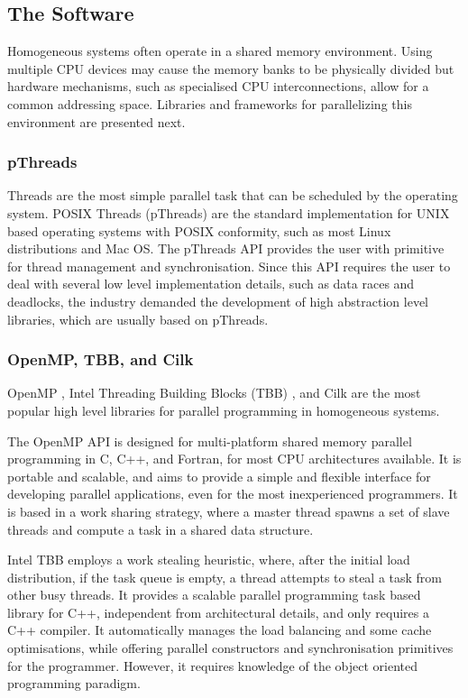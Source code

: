 \subsection{The Software}
\label{shared_mem}

Homogeneous systems often operate in a shared memory environment. Using multiple CPU devices may cause the memory banks to be physically divided but hardware mechanisms, such as specialised CPU interconnections, allow for a common addressing space. Libraries and frameworks for parallelizing this environment are presented next.

\subsubsection*{pThreads}

Threads are the most simple parallel task that can be scheduled by the operating system. POSIX Threads (pThreads) are the standard implementation for UNIX based operating systems with POSIX conformity, such as most Linux distributions and Mac OS. The pThreads API provides the user with primitive for thread management and synchronisation. Since this API requires the user to deal with several low level implementation details, such as data races and deadlocks, the industry demanded the development of high abstraction level libraries, which are usually based on pThreads.

\subsubsection*{OpenMP, TBB, and Cilk}

OpenMP \cite{OpenMP}, Intel Threading Building Blocks (TBB) \cite{Intel:TBB}, and Cilk \cite{Intel:Cilk} are the most popular high level libraries for parallel programming in homogeneous systems.

The OpenMP API is designed for multi-platform shared memory parallel programming in C, C++, and Fortran, for most CPU architectures available. It is portable and scalable, and aims to provide a simple and flexible interface for developing parallel applications, even for the most inexperienced programmers. It is based in a work sharing strategy, where a master thread spawns a set of slave threads and compute a task in a shared data structure.

Intel TBB employs a work stealing heuristic, where, after the initial load distribution, if the task queue is empty, a thread attempts to steal a task from other busy threads. It provides a scalable parallel programming task based library for C++, independent from architectural details, and only requires a \intel C++ compiler. It automatically manages the load balancing and some cache optimisations, while offering parallel constructors and synchronisation primitives for the programmer. However, it requires knowledge of the object oriented programming paradigm.

